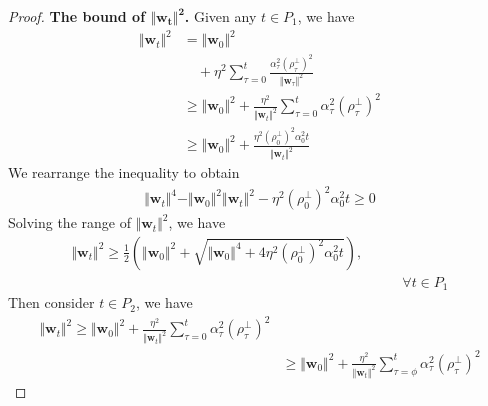 \documentclass[pdflatex,sn-basic]{sn-jnl}%
\theoremstyle{thmstyleone}%
\begin{document}
\begin{appendices}
\begin{proof}
  \noindent\textbf{The bound of $\boldsymbol{\Vert \mathbf{w}_t \Vert^2}$.}
  Given any $t \in P_1$, we have 
  \begin{equation*}
  \begin{aligned}
    \Vert \mathbf{w}_t \Vert^2 & = 
    \Vert \mathbf{w}_{0} \Vert^2 
    \\ & \quad
    +
    \eta^2 \sum_{\tau = 0}^{t}  
    \frac{\alpha_{\tau}^2 \left(\rho_{\tau}^{\perp}\right)^2}{\Vert \mathbf{w}_{\tau} \Vert^2}
    \\ & \ge
    \Vert \mathbf{w}_{0} \Vert^2
    +
    \frac{\eta^2}{\Vert \mathbf{w}_{t} \Vert^2}
    \sum_{\tau = 0}^{t}
      \alpha_{\tau}^2 \left(\rho_{\tau}^{\perp}\right)^2
    \\ & \ge
    \Vert \mathbf{w}_{0} \Vert^2
    +
    \frac{
      \eta^2 \left(\rho_{0}^{\perp}\right)^2 \alpha_{0}^2 t
    }{
      \Vert \mathbf{w}_{t} \Vert^2
    }
  \end{aligned}
  \end{equation*}
  We rearrange the inequality to obtain
  \begin{equation*}
  \begin{aligned}
    \Vert \mathbf{w}_t \Vert^4
    -
    \Vert \mathbf{w}_{0} \Vert^2 \Vert \mathbf{w}_t \Vert^2
    -
    \eta^2 (\rho_{0}^{\perp})^2 \alpha_0^2 t
    \ge 0
  \end{aligned}
  \end{equation*}
  Solving the range of $\Vert \mathbf{w}_t \Vert^2$, we have
  \begin{equation*}
  \begin{aligned}
    \Vert \mathbf{w}_t \Vert^2 \ge 
    \frac{1}{2}
    \left(
      \Vert \mathbf{w}_0 \Vert^2 
      +
      \sqrt{
        \Vert \mathbf{w}_0 \Vert^4
        +
        4  \eta^2 (\rho_{0}^{\perp})^2 \alpha_0^2 t
      }
    \right),
    \\ & \qquad \forall t \in P_1
  \end{aligned}
  \end{equation*}
  Then consider $t \in P_2$, we have 
  \begin{equation*}
  \begin{aligned}
    \Vert \mathbf{w}_t \Vert^2 
    \ge 
    \Vert \mathbf{w}_{0} \Vert^2 + 
    \frac{\eta^2}{\Vert \mathbf{w}_{t} \Vert^2}
    \sum_{\tau = 0}^{t} \alpha_{\tau}^2 \left(\rho_{\tau}^{\perp}\right)^2
    \\ & \ge 
    \Vert \mathbf{w}_{0} \Vert^2 + 
    \frac{\eta^2}{\Vert \mathbf{w}_{t} \Vert^2}
    \sum_{\tau = \phi}^{t} \alpha_{\tau}^2 \left(\rho_{\tau}^{\perp}\right)^2

\end{aligned}
\end{equation*}
\end{proof}
\end{appendices}
\end{document}

